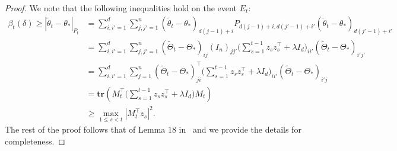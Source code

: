 \documentclass[11pt]{article}
\theoremstyle{plain}
\theoremstyle{definition}
\theoremstyle{remark}
\begin{document}
\begin{proof}
We note that the following inequalities hold on the event $E_t$:
\begin{equation*}
\begin{split}
    \beta_t(\delta)\geq |\tilde{\theta}_t-\theta_*|_{P_t} &= \sum_{i,i'=1}^{d}\sum_{j,j'=1}^{n}(\tilde{\theta}_t-\theta_*)_{d(j-1)+i}P_{d(j-1)+i,d(j'-1)+i'}(\tilde{\theta}_t-\theta_*)_{d(j'-1)+i'}\\
    & = \sum_{i,i'=1}^{d}\sum_{j,j'=1}^{n} (\tilde{\Theta}_t-\Theta_*)_{ij}(I_n)_{jj'}\bigg (\sum_{s=1}^{t-1}z_sz_s^{\top}+\lambda I_d\bigg )_{ii'}(\tilde{\Theta}_t-\Theta_*)_{i'j'}\\
    & = \sum_{i,i'=1}^{d}\sum_{j=1}^{n} (\tilde{\Theta}_t-\Theta_*)^{\top}_{ji}\bigg( \sum_{s=1}^{t-1}z_sz_s^{\top}+\lambda I_d\bigg )_{ii'}(\tilde{\Theta}_t-\Theta_*)_{i'j}\\
    &= \mathbf{tr}\left (M_t^\top \bigg (\sum_{s=1}^{t-1} z_s z_s^\top +\lambda I_d\bigg )M_t\right)\\
    &\geq \max_{1\leq s < t} |M_t^\top z_s|^2.
\end{split}
\end{equation*}
The rest of the proof follows that of Lemma 18 in~\cite{abbasi2011improved} and we provide the details for completeness.


\end{proof}
\end{document}
